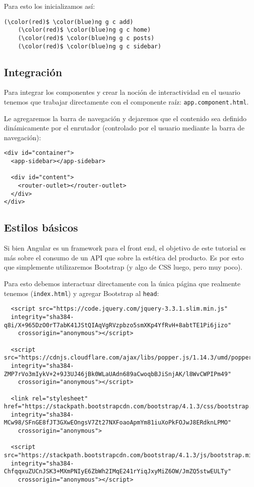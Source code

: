 \documentclass{article}
\begin{document}
Para esto los inicializamos as\'i:

\begin{Verbatim}[fontsize=\small,commandchars=\\\(\)]
    (\color(red)$ \color(blue)ng g c add)
    (\color(red)$ \color(blue)ng g c home)
    (\color(red)$ \color(blue)ng g c posts)
    (\color(red)$ \color(blue)ng g c sidebar)
\end{Verbatim}

\subsection{Integraci\'on}
Para integrar los componentes y crear la noci\'on de interactividad en el usuario tenemos que trabajar directamente con el componente ra\'iz: \texttt{app.component.html}.

Le agregaremos la barra de navegaci\'on y dejaremos que el contenido sea definido din\'amicamente por el enrutador (controlado por el usuario mediante la barra de navegaci\'on):

\begin{verbatim}
<div id="container">
  <app-sidebar></app-sidebar>

  <div id="content">
    <router-outlet></router-outlet>
  </div>
</div>
\end{verbatim}

\subsection{Estilos b\'asicos}
Si bien Angular es un framework para el front end, el objetivo de este tutorial es m\'as sobre el consumo de un API que sobre la est\'etica del producto. Es por esto que simplemente utilizaremos Bootstrap (y algo de CSS luego, pero muy poco).

Para esto debemos interactuar directamente con la \'unica p\'agina que realmente tenemos (\texttt{index.html}) y agregar Bootstrap al \texttt{head}:

\begin{verbatim}
  <script src="https://code.jquery.com/jquery-3.3.1.slim.min.js"
  integrity="sha384-q8i/X+965DzO0rT7abK41JStQIAqVgRVzpbzo5smXKp4YfRvH+8abtTE1Pi6jizo"
    crossorigin="anonymous"></script>
    
  <script src="https://cdnjs.cloudflare.com/ajax/libs/popper.js/1.14.3/umd/popper.min.js" 
  integrity="sha384-ZMP7rVo3mIykV+2+9J3UJ46jBk0WLaUAdn689aCwoqbBJiSnjAK/l8WvCWPIPm49"
    crossorigin="anonymous"></script>

  <link rel="stylesheet" href="https://stackpath.bootstrapcdn.com/bootstrap/4.1.3/css/bootstrap.min.css" 
  integrity="sha384-MCw98/SFnGE8fJT3GXwEOngsV7Zt27NXFoaoApmYm81iuXoPkFOJwJ8ERdknLPMO"
    crossorigin="anonymous">
    
  <script src="https://stackpath.bootstrapcdn.com/bootstrap/4.1.3/js/bootstrap.min.js" 
  integrity="sha384-ChfqqxuZUCnJSK3+MXmPNIyE6ZbWh2IMqE241rYiqJxyMiZ6OW/JmZQ5stwEULTy"
    crossorigin="anonymous"></script>
\end{verbatim}
\end{document}
